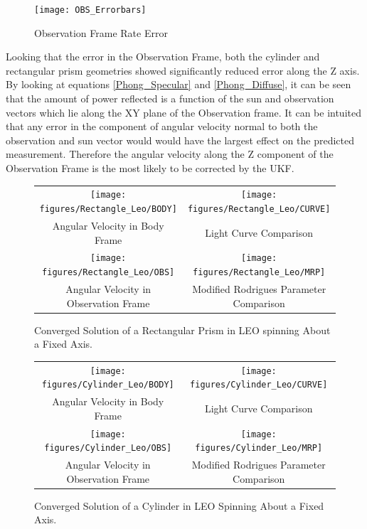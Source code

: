 \begin{figure}[ht]
	\begin{center}
		\texttt{[image: OBS\_Errorbars]}
		\caption{Observation Frame Rate Error}
	\end{center}
\end{figure}


Looking that the error in the Observation Frame, both the cylinder and rectangular prism geometries showed significantly reduced error along the Z axis. By looking at equations \ref{Phong_Specular} and \ref{Phong_Diffuse}, it can be seen that the amount of power reflected is a function of the sun and observation vectors which lie along the XY plane of the Observation frame. It can be intuited that any error in the component of angular velocity normal to both the observation and sun vector would would have the largest effect on the predicted measurement. Therefore the angular velocity along the Z component of the Observation Frame is the most likely to be corrected by the UKF.

\begin{figure}[ht]
	\begin{tabular}{cc}
		\texttt{[image: figures/Rectangle\_Leo/BODY]} &
		\texttt{[image: figures/Rectangle\_Leo/CURVE]} \\
		Angular Velocity in Body Frame & Light Curve Comparison \\
		\texttt{[image: figures/Rectangle\_Leo/OBS]} &
		\texttt{[image: figures/Rectangle\_Leo/MRP]} \\
		Angular Velocity in Observation Frame & Modified Rodrigues Parameter Comparison
	\end{tabular}
	\caption{Converged Solution of a Rectangular Prism in LEO spinning About a Fixed Axis.}
\end{figure}


\begin{figure}[!ht]
	\begin{tabular}{cc}
		\texttt{[image: figures/Cylinder\_Leo/BODY]} &
		\texttt{[image: figures/Cylinder\_Leo/CURVE]} \\
		Angular Velocity in Body Frame & Light Curve Comparison \\
		\texttt{[image: figures/Cylinder\_Leo/OBS]} &
		\texttt{[image: figures/Cylinder\_Leo/MRP]} \\
		Angular Velocity in Observation Frame & Modified Rodrigues Parameter Comparison
	\end{tabular}
	\caption{Converged Solution of a Cylinder in LEO Spinning About a Fixed Axis.}
\end{figure}

